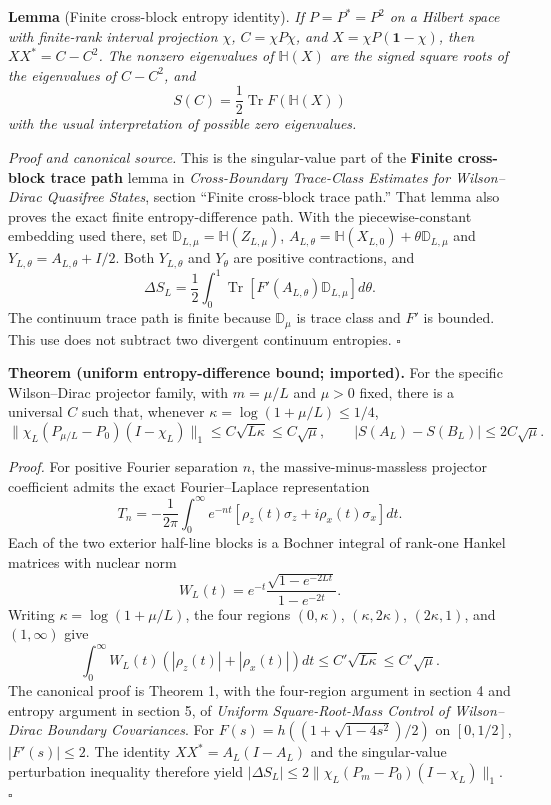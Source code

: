 \documentclass[
  10pt,
  a4paper,
]{article}
\begin{document}
\label{lem:cross}
\textbf{Lemma} (Finite cross-block entropy identity). \emph{If \(P=P^*=P^2\) on a Hilbert space with finite-rank interval projection \(\chi\), \(C=\chi P\chi\), and \(X=\chi P(\mathbf 1-\chi)\), then \(XX^*=C-C^2\). The nonzero eigenvalues of \(\mathbb H(X)\) are the signed square roots of the eigenvalues of \(C-C^2\), and \[S(C)=\frac12\operatorname{Tr}F(\mathbb H(X))\] with the usual interpretation of possible zero eigenvalues.}

\emph{Proof and canonical source.} This is the singular-value part of the \textbf{Finite cross-block trace path} lemma in \emph{Cross-Boundary Trace-Class Estimates for Wilson--Dirac Quasifree States}, section ``Finite cross-block trace path.'' That lemma also proves the exact finite entropy-difference path. With the piecewise-constant embedding used there, set \(\mathbb D_{L,\mu}=\mathbb H(Z_{L,\mu})\), \(A_{L,\theta}=\mathbb H(X_{L,0})+\theta\mathbb D_{L,\mu}\) and \(Y_{L,\theta}=A_{L,\theta}+I/2\). Both \(Y_{L,\theta}\) and \(Y_\theta\) are positive contractions, and \[
\Delta S_L=\frac12\int_0^1\operatorname{Tr}[F'(A_{L,\theta})\mathbb D_{L,\mu}]d\theta.
\] The continuum trace path is finite because \(\mathbb D_\mu\) is trace class and \(F'\) is bounded. This use does not subtract two divergent continuum entropies. \(\square\)

\textbf{Theorem (uniform entropy-difference bound; imported).} For the specific Wilson--Dirac projector family, with \(m=\mu/L\) and \(\mu>0\) fixed, there is a universal \(C\) such that, whenever \(\kappa=\log(1+\mu/L)\le 1/4\), \[
\|\chi_L(P_{\mu/L}-P_0)(I-\chi_L)\|_1\le C\sqrt{L\kappa}\le C\sqrt\mu,
\qquad |S(A_L)-S(B_L)|\le 2C\sqrt\mu.
\]

\emph{Proof.} For positive Fourier separation \(n\), the massive-minus-massless projector coefficient admits the exact Fourier--Laplace representation \[
T_n=-\frac1{2\pi}\int_0^\infty e^{-nt}
[\rho_z(t)\sigma_z+i\rho_x(t)\sigma_x]dt.
\] Each of the two exterior half-line blocks is a Bochner integral of rank-one Hankel matrices with nuclear norm \[
W_L(t)=e^{-t}\frac{\sqrt{1-e^{-2Lt}}}{1-e^{-2t}}.
\] Writing \(\kappa=\log(1+\mu/L)\), the four regions \((0,\kappa)\), \((\kappa,2\kappa)\), \((2\kappa,1)\), and \((1,\infty)\) give \[
\int_0^\infty W_L(t)(|\rho_z(t)|+|\rho_x(t)|)dt
\le C'\sqrt{L\kappa}\le C'\sqrt\mu.
\] The canonical proof is Theorem 1, with the four-region argument in section 4 and entropy argument in section 5, of \emph{Uniform Square-Root-Mass Control of Wilson--Dirac Boundary Covariances}. For \(F(s)=h((1+\sqrt{1-4s^2})/2)\) on \([0,1/2]\), \(|F'(s)|\le2\). The identity \(XX^*=A_L(I-A_L)\) and the singular-value perturbation inequality therefore yield \(|\Delta S_L|\le2\|\chi_L(P_m-P_0)(I-\chi_L)\|_1\). \(\square\)
\end{document}
